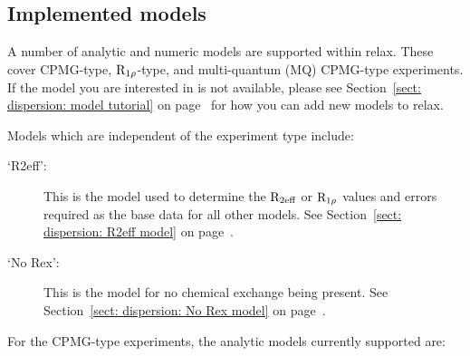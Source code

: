 
\subsection{Implemented models}
\label{sect: dispersion: implemented models}

A number of analytic and numeric models are supported within relax.
These cover CPMG-type, $\mathrm{R}_{1\rho}$-type, and multi-quantum (MQ) CPMG-type experiments. 
If the model you are interested in is not available, please see Section~\ref{sect: dispersion: model tutorial} on page~\pageref{sect: dispersion: model tutorial} for how you can add new models to relax.

Models which are independent of the experiment type include:

\begin{description}
\item[`R2eff':]  This is the model used to determine the $\mathrm{R}_\textrm{2eff}$ or $\mathrm{R}_{1\rho}$ values and errors required as the base data for all other models.  See Section~\ref{sect: dispersion: R2eff model} on page~\pageref{sect: dispersion: R2eff model}.
\item[`No Rex':]  This is the model for no chemical exchange being present.  See Section~\ref{sect: dispersion: No Rex model} on page~\pageref{sect: dispersion: No Rex model}.
\end{description}


For the CPMG-type experiments, the analytic models currently supported are:

